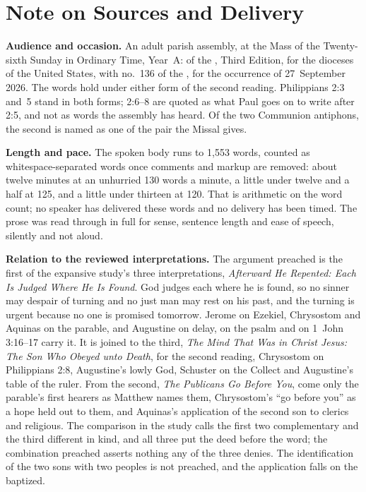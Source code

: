 
\section*{Note on Sources and Delivery}

{\small

\textbf{Audience and occasion.} An adult parish assembly, at the Mass of the
Twenty-sixth Sunday in Ordinary Time, Year~A:  of the , Third Edition, for the dioceses of the
United States, with no.~136 of the , for the
occurrence of 27~September 2026. The words hold under either form of the
second reading. Philippians 2:3 and~5 stand in both forms; 2:6--8 are quoted
as what Paul goes on to write after 2:5, and not as words the assembly has
heard. Of the two Communion antiphons, the second is named as one of the pair
the Missal gives.

\textbf{Length and pace.} The spoken body runs to 1,553 words, counted as
whitespace-separated words once comments and markup are removed: about twelve
minutes at an unhurried 130 words a minute, a little under twelve and a half
at 125, and a little under thirteen at 120. That is arithmetic on
the word count; no speaker has delivered these words and no delivery has
been timed. The prose was read through in full for sense, sentence length
and ease of speech, silently and not aloud.

\textbf{Relation to the reviewed interpretations.} The argument preached is
the first of the expansive study's three interpretations, \textit{Afterward
He Repented: Each Is Judged Where He Is Found}. God judges each where he is
found, so no sinner may despair of turning and no just man may rest on his
past, and the turning is urgent because no one is promised tomorrow. Jerome
on Ezekiel, Chrysostom and Aquinas on the parable, and Augustine on delay, on
the psalm and on 1~John 3:16--17 carry it. It is joined to the third,
\textit{The Mind That Was in Christ Jesus: The Son Who Obeyed unto Death},
for the second reading, Chrysostom on Philippians 2:8, Augustine's lowly
God, Schuster on the Collect and Augustine's table of the ruler. From the
second, \textit{The Publicans Go Before You}, come only the parable's first
hearers as Matthew names them, Chrysostom's ``go before you'' as a hope held
out to them, and Aquinas's application of the second son to clerics and
religious. The comparison in the study calls the first two complementary and
the third different in kind, and all three put the deed before the word; the
combination preached asserts nothing any of the three denies. The
identification of the two sons with two peoples is not preached, and the
application falls on the baptized.

}
